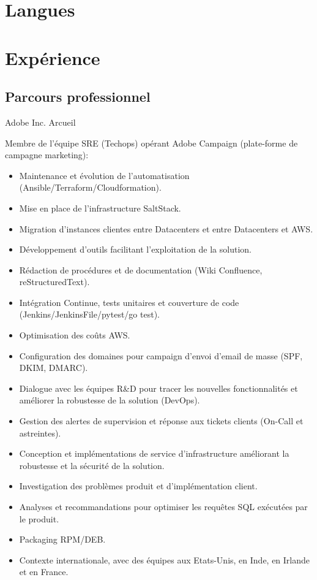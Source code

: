 \documentclass[10pt,a4paper,sans]{moderncv}        %
\begin{document}
\section{Langues}


\section{Expérience}
\subsection{Parcours professionnel}


              {Adobe Inc.}
              {Arcueil}
              {}
	      {Membre de l'équipe SRE (Techops) opérant Adobe Campaign (plate-forme de campagne marketing):
                 \begin{itemize}
                 \item Maintenance et évolution de l'automatisation (Ansible/Terraform/Cloudformation).
                 \item Mise en place de l'infrastructure SaltStack.
                 \item Migration d'instances clientes entre Datacenters et entre Datacenters et AWS.
                 \item Développement d'outils facilitant l'exploitation de la solution.
                 \item Rédaction de procédures et de documentation (Wiki Confluence, reStructuredText).
		 \item Intégration Continue, tests unitaires et couverture de code (Jenkins/JenkinsFile/pytest/go test).
                 \item Optimisation des coûts AWS.
		 \item Configuration des domaines pour campaign d'envoi d'email de masse (SPF, DKIM, DMARC).
                 \item Dialogue avec les équipes R\&D pour tracer les nouvelles fonctionnalités et améliorer la robustesse de la solution (DevOps).
                 \item Gestion des alertes de supervision et réponse aux tickets clients (On-Call et astreintes).
		 \item Conception et implémentations de service d'infrastructure améliorant la robustesse et la sécurité de la solution.
                 \item Investigation des problèmes produit et d'implémentation client.
		 \item Analyses et recommandations pour optimiser les requêtes SQL exécutées par le produit.
		 \item Packaging RPM/DEB.
		 \item Contexte internationale, avec des équipes aux Etats-Unis, en Inde, en Irlande et en France.
                 \end{itemize}
              }
\end{document}
